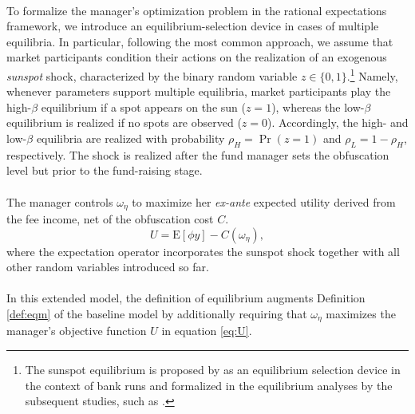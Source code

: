 \paragraph{}
To formalize the manager's optimization problem in the rational expectations framework, we introduce an equilibrium-selection device in cases of multiple equilibria. In particular, following the most common approach, we assume that market participants condition their actions on the realization of an exogenous \textit{sunspot} shock, characterized by the binary random variable $z\in\{0,1\}$.\footnote{The sunspot equilibrium is proposed by \citet{diamond1983bank} as an equilibrium selection device in the context of bank runs and formalized in the equilibrium analyses by the subsequent studies, such as \citet{cooper1998bank}.} Namely, whenever parameters support multiple equilibria, market participants play the high-$\beta$ equilibrium if a spot appears on the sun ($z=1$), whereas the low-$\beta$ equilibrium is realized if no spots are observed ($z=0$). Accordingly, the high- and low-$\beta$ equilibria are realized with probability $\rho_{H}=\Pr(z=1)$ and $\rho_{L} = 1-\rho_{H}$, respectively. The shock is realized after the fund manager sets the obfuscation level but prior to the fund-raising stage. 

\paragraph{}
The manager controls $\omega_{\eta}$ to maximize her \textit{ex-ante} expected utility derived from the fee income, net of the obfuscation cost $C$.
\begin{equation}
U = \mathrm{E}[\phi y] - C(\omega_{\eta}),\label{eq:U}
\end{equation}
where the expectation operator incorporates the sunspot shock together with all other random variables introduced so far.

\paragraph{}
In this extended model, the definition of equilibrium augments Definition \ref{def:eqm} of the baseline model by additionally requiring that $\omega_{\eta}$ maximizes the manager’s objective function $U$ in equation \eqref{eq:U}.

